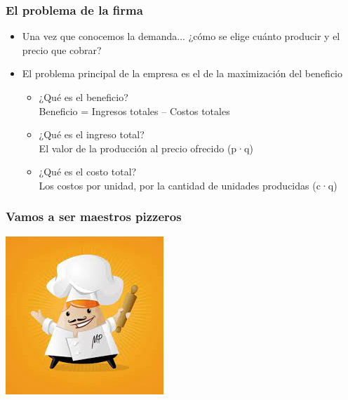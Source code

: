 \documentclass{beamer}
\begin{document}
\begin{frame}
\frametitle{El problema de la firma}
\begin{itemize}
    \item Una vez que conocemos la demanda... ¿cómo se elige cuánto producir y el precio que cobrar?
    \vspace{2mm}
    \item El problema principal de la empresa es el de la maximización del beneficio
    \vspace{2mm}     \begin{itemize}
        \item ¿Qué es el beneficio? \vspace{2mm} \\ 
        Beneficio = Ingresos totales – Costos totales
        \vspace{2mm}
        \item ¿Qué es el ingreso total? 
        \vspace{2mm} \\ 
        El valor de la producción al precio ofrecido (p·q)
        \vspace{2mm}
        \item ¿Qué es el costo total?
        \vspace{2mm} \\ 
        Los costos por unidad, por la cantidad de unidades producidas (c·q)
    \end{itemize} 
\end{itemize} 
\end{frame}

\begin{frame}
\frametitle{Vamos a ser maestros pizzeros}
\centering
\includegraphics[scale=0.6]{Figures/Tema_06.12_maestrospizzeros.jpg}
\end{frame}
\end{document}
